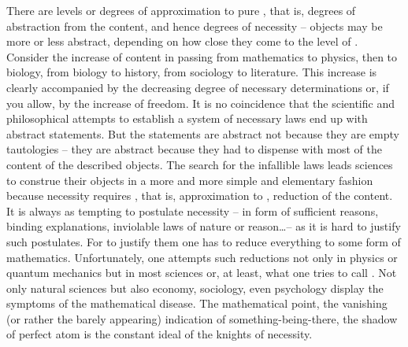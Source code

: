 \pa There are levels or degrees of approximation to pure , that
is, degrees of abstraction from the  content, and hence degrees of
necessity -- objects may be more or less abstract, depending on how close they
come to the level of .  Consider the increase of 
content in passing from mathematics to physics, then to biology, from biology to
history, from sociology to literature.  This increase is clearly accompanied by
the decreasing degree of necessary determinations or, if you allow, by the
increase of freedom.  It is no coincidence that the scientific and philosophical
attempts to establish a system of necessary laws end up with abstract
statements.  But the statements are abstract not because they are empty
tautologies -- they are abstract because they had to dispense with most of the
 content of the described objects.  The search for the infallible
laws leads sciences to construe their objects in a more and more simple and
elementary fashion because necessity requires , that is,
approximation to , reduction of the  content.  It is
always as tempting to postulate necessity -- in form of sufficient reasons,
binding explanations, inviolable laws of nature or reason\ldots -- as it is hard to
justify such postulates. For to justify them one has to reduce everything to
some form of mathematics.  Unfortunately, one attempts such reductions not only
in physics or quantum mechanics but in most sciences or, at least, what one
tries to call .  Not only natural sciences but also economy,
sociology, even psychology display the symptoms of the mathematical disease.
The mathematical point, the vanishing (or rather the barely appearing)
indication of something-being-there, the shadow of perfect atom is the constant
ideal of the knights of necessity.

